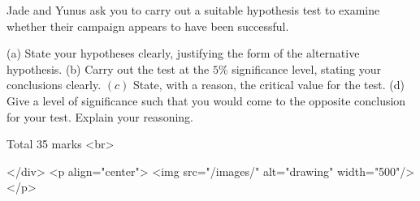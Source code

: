 Jade and Yunus ask you to carry out a suitable hypothesis test to examine whether their campaign appears to have been successful.

(a) State your hypotheses clearly, justifying the form of the alternative hypothesis.
(b) Carry out the test at the $5 \%$ significance level, stating your conclusions clearly.
\((c)\) State, with a reason, the critical value for the test.
(d) Give a level of significance such that you would come to the opposite conclusion for your test. Explain your reasoning.

Total 35 marks
<br>

</div>
<p align="center">
<img src="/images/" alt="drawing" width="500"/>
</p>
